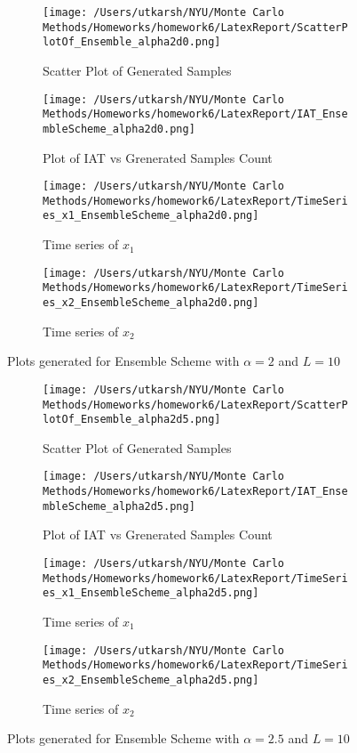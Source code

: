 \documentclass[11pt]{article}
\begin{document}
\begin{figure}[H]
	\centering
	\begin{subfigure}{.22\textwidth}
		\texttt{[image: /Users/utkarsh/NYU/Monte Carlo Methods/Homeworks/homework6/LatexReport/ScatterPlotOf\_Ensemble\_alpha2d0.png]}
		\caption{Scatter Plot of Generated Samples}
		\label{fig:en_2_scatter}
	\end{subfigure}
	\begin{subfigure}{.22\textwidth}
		\texttt{[image: /Users/utkarsh/NYU/Monte Carlo Methods/Homeworks/homework6/LatexReport/IAT\_EnsembleScheme\_alpha2d0.png]}
		\caption{Plot of IAT vs Grenerated Samples Count}
		\label{fig:en_2_iat}
	\end{subfigure}
	\begin{subfigure}{.22\textwidth}
		\texttt{[image: /Users/utkarsh/NYU/Monte Carlo Methods/Homeworks/homework6/LatexReport/TimeSeries\_x1\_EnsembleScheme\_alpha2d0.png]}
		\caption{Time series of $x_1$}
		\label{fig:en_2_time_x1}
	\end{subfigure}
	\begin{subfigure}{.22\textwidth}
		\texttt{[image: /Users/utkarsh/NYU/Monte Carlo Methods/Homeworks/homework6/LatexReport/TimeSeries\_x2\_EnsembleScheme\_alpha2d0.png]}
		\caption{Time series of $x_2$}
		\label{fig:en_2_time_x2}
	\end{subfigure}
	\caption{Plots generated for Ensemble Scheme with $\alpha = 2$ and $L = 10$}
	\label{fig:en_2_plots}
\end{figure}


\begin{figure}[H]
	\centering
	\begin{subfigure}{.22\textwidth}
		\texttt{[image: /Users/utkarsh/NYU/Monte Carlo Methods/Homeworks/homework6/LatexReport/ScatterPlotOf\_Ensemble\_alpha2d5.png]}
		\caption{Scatter Plot of Generated Samples}
		\label{fig:en_2.5_scatter}
	\end{subfigure}
	\begin{subfigure}{.22\textwidth}
		\texttt{[image: /Users/utkarsh/NYU/Monte Carlo Methods/Homeworks/homework6/LatexReport/IAT\_EnsembleScheme\_alpha2d5.png]}
		\caption{Plot of IAT vs Grenerated Samples Count}
		\label{fig:en_2.5_iat}
	\end{subfigure}
	\begin{subfigure}{.22\textwidth}
		\texttt{[image: /Users/utkarsh/NYU/Monte Carlo Methods/Homeworks/homework6/LatexReport/TimeSeries\_x1\_EnsembleScheme\_alpha2d5.png]}
		\caption{Time series of $x_1$}
		\label{fig:en_2.5_time_x1}
	\end{subfigure}
	\begin{subfigure}{.22\textwidth}
		\texttt{[image: /Users/utkarsh/NYU/Monte Carlo Methods/Homeworks/homework6/LatexReport/TimeSeries\_x2\_EnsembleScheme\_alpha2d5.png]}
		\caption{Time series of $x_2$}
		\label{fig:en_2.5_time_x2}
	\end{subfigure}
	\caption{Plots generated for Ensemble Scheme with $\alpha = 2.5$ and $L = 10$}
	\label{fig:en_2.5_plots}
\end{figure}
\end{document}
